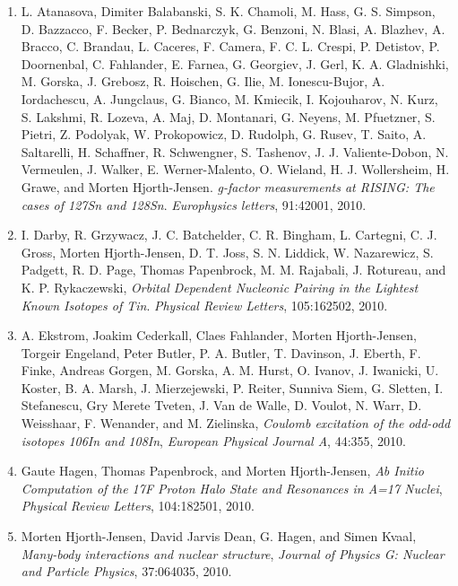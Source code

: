 \documentclass[%
oneside,                 %
final,                   %
10pt]{article}
\begin{document}
\begin{enumerate}
\item L. Atanasova, Dimiter Balabanski, S. K. Chamoli, M. Hass, G. S. Simpson,   D. Bazzacco, F. Becker, P. Bednarczyk, G. Benzoni, N. Blasi, A. Blazhev,   A. Bracco, C. Brandau, L. Caceres, F. Camera, F. C. L. Crespi, P. Detistov,   P. Doornenbal, C. Fahlander, E. Farnea, G. Georgiev, J. Gerl, K. A.   Gladnishki, M. Gorska, J. Grebosz, R. Hoischen, G. Ilie, M. Ionescu-Bujor,   A. Iordachescu, A. Jungclaus, G. Bianco, M. Kmiecik, I. Kojouharov, N. Kurz,   S. Lakshmi, R. Lozeva, A. Maj, D. Montanari, G. Neyens, M. Pfuetzner,   S. Pietri, Z. Podolyak, W. Prokopowicz, D. Rudolph, G. Rusev, T. Saito,   A. Saltarelli, H. Schaffner, R. Schwengner, S. Tashenov, J. J.   Valiente-Dobon, N. Vermeulen, J. Walker, E. Werner-Malento, O. Wieland, H. J.   Wollersheim, H. Grawe, and Morten Hjorth-Jensen.  \emph{g-factor measurements at RISING: The cases of 127Sn and   128Sn}.  \emph{Europhysics letters}, 91:42001, 2010. 

\item I. Darby, R. Grzywacz, J. C. Batchelder, C. R. Bingham, L. Cartegni, C. J.   Gross, Morten Hjorth-Jensen, D. T. Joss, S. N. Liddick, W. Nazarewicz,   S. Padgett, R. D. Page, Thomas Papenbrock, M. M. Rajabali, J. Rotureau, and   K. P. Rykaczewski, \emph{Orbital Dependent Nucleonic Pairing in the Lightest Known   Isotopes of Tin}.  \emph{Physical Review Letters}, 105:162502, 2010. 

\item A. Ekstrom, Joakim Cederkall, Claes Fahlander, Morten Hjorth-Jensen, Torgeir   Engeland, Peter Butler, P. A. Butler, T. Davinson, J. Eberth, F. Finke,   Andreas Gorgen, M. Gorska, A. M. Hurst, O. Ivanov, J. Iwanicki, U. Koster,   B. A. Marsh, J. Mierzejewski, P. Reiter, Sunniva Siem, G. Sletten,   I. Stefanescu, Gry Merete Tveten, J. Van de Walle, D. Voulot, N. Warr,   D. Weisshaar, F. Wenander, and M. Zielinska, \emph{Coulomb excitation of the odd-odd isotopes 106In and 108In},  \emph{European Physical Journal A}, 44:355, 2010. 

\item Gaute Hagen, Thomas Papenbrock, and Morten Hjorth-Jensen,  \emph{Ab Initio Computation of the 17F Proton Halo State and Resonances in A=17 Nuclei},  \emph{Physical Review Letters}, 104:182501, 2010. 

\item Morten Hjorth-Jensen, David Jarvis Dean, G. Hagen, and Simen Kvaal,  \emph{Many-body interactions and nuclear structure},  \emph{Journal of Physics G: Nuclear and Particle Physics}, 37:064035,   2010. 


\end{enumerate}
\end{document}

